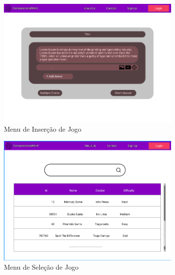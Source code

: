 \documentclass[11pt,a4paper]{report}
\begin{document}
\begin{figure}
     \hfill
     \begin{subfigure}[b]{0.4\textwidth}
         \centering
         \includegraphics[width=\textwidth]{MockTeacherMenu.png}
         \caption{Menu de Inserção de Jogo}
         \label{fig:MockTeacherMenu}
     \end{subfigure}
     \hfill
     \begin{subfigure}[b]{0.4\textwidth}
         \centering
         \includegraphics[width=\textwidth]{MockUserSelectGame.png}
         \caption{Menu de Seleção de Jogo}
         \label{fig:MockUserSelectGame}
     \end{subfigure}
     \hfill
     \begin{subfigure}[b]{0.4\textwidth}
         \centering

\end{subfigure}
\end{figure}
\end{document}
